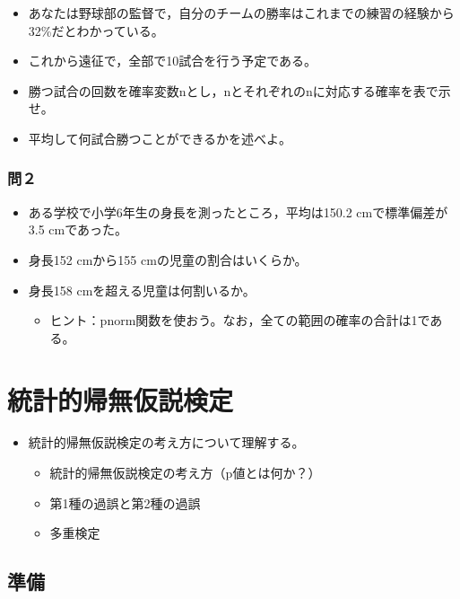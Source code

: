 \documentclass[]{article}
\providecommand{\tightlist}{%
  \setlength{\itemsep}{0pt}\setlength{\parskip}{0pt}}
\begin{document}
\begin{itemize}
\item
  あなたは野球部の監督で，自分のチームの勝率はこれまでの練習の経験から32\%だとわかっている。
\item
  これから遠征で，全部で10試合を行う予定である。
\item
  勝つ試合の回数を確率変数nとし，nとそれぞれのnに対応する確率を表で示せ。
\item
  平均して何試合勝つことができるかを述べよ。
\end{itemize}

\subsubsection{問２}\label{-9}

\begin{itemize}
\item
  ある学校で小学6年生の身長を測ったところ，平均は150.2 cmで標準偏差が3.5
  cmであった。
\item
  身長152 cmから155 cmの児童の割合はいくらか。
\item
  身長158 cmを超える児童は何割いるか。

  \begin{itemize}
  \tightlist
  \item
    ヒント：pnorm関数を使おう。なお，全ての範囲の確率の合計は1である。
  \end{itemize}
\end{itemize}

\section{統計的帰無仮説検定}

\begin{itemize}
\tightlist
\item
  統計的帰無仮説検定の考え方について理解する。

  \begin{itemize}
  \tightlist
  \item
    統計的帰無仮説検定の考え方（p値とは何か？）
  \item
    第1種の過誤と第2種の過誤
  \item
    多重検定
  \end{itemize}
\end{itemize}

\subsection{準備}\label{-2}
\end{document}
